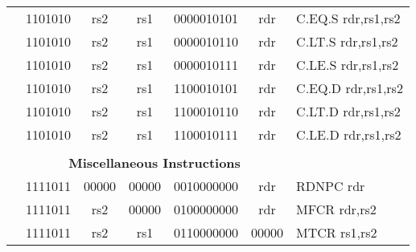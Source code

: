 \begin{table}[p]
\begin{small}
\begin{center}
\begin{tabular}{rcccccccccccl}
&
\multicolumn{2}{|c|}{1101010} &
\multicolumn{1}{c|}{rs2} &
\multicolumn{1}{c|}{rs1} &
\multicolumn{6}{c|}{0000010101} &
\multicolumn{1}{c|}{rdr} & C.EQ.S rdr,rs1,rs2 \\
\cline{2-12}
  

&
\multicolumn{2}{|c|}{1101010} &
\multicolumn{1}{c|}{rs2} &
\multicolumn{1}{c|}{rs1} &
\multicolumn{6}{c|}{0000010110} &
\multicolumn{1}{c|}{rdr} & C.LT.S rdr,rs1,rs2 \\
\cline{2-12}
  

&
\multicolumn{2}{|c|}{1101010} &
\multicolumn{1}{c|}{rs2} &
\multicolumn{1}{c|}{rs1} &
\multicolumn{6}{c|}{0000010111} &
\multicolumn{1}{c|}{rdr} & C.LE.S rdr,rs1,rs2 \\
\cline{2-12}
  

&
\multicolumn{2}{|c|}{1101010} &
\multicolumn{1}{c|}{rs2} &
\multicolumn{1}{c|}{rs1} &
\multicolumn{6}{c|}{1100010101} &
\multicolumn{1}{c|}{rdr} & C.EQ.D rdr,rs1,rs2 \\
\cline{2-12}
  

&
\multicolumn{2}{|c|}{1101010} &
\multicolumn{1}{c|}{rs2} &
\multicolumn{1}{c|}{rs1} &
\multicolumn{6}{c|}{1100010110} &
\multicolumn{1}{c|}{rdr} & C.LT.D rdr,rs1,rs2 \\
\cline{2-12}
  

&
\multicolumn{2}{|c|}{1101010} &
\multicolumn{1}{c|}{rs2} &
\multicolumn{1}{c|}{rs1} &
\multicolumn{6}{c|}{1100010111} &
\multicolumn{1}{c|}{rdr} & C.LE.D rdr,rs1,rs2 \\
\cline{2-12}
  

&
\multicolumn{11}{c}{} & \\
&
\multicolumn{11}{c}{\bf Miscellaneous Instructions} & \\
\cline{2-12}
  

&
\multicolumn{2}{|c|}{1111011} &
\multicolumn{1}{c|}{00000} &
\multicolumn{1}{c|}{00000} &
\multicolumn{6}{c|}{0010000000} &
\multicolumn{1}{c|}{rdr} & RDNPC rdr \\
\cline{2-12}
  

&
\multicolumn{2}{|c|}{1111011} &
\multicolumn{1}{c|}{rs2} &
\multicolumn{1}{c|}{00000} &
\multicolumn{6}{c|}{0100000000} &
\multicolumn{1}{c|}{rdr} & MFCR rdr,rs2 \\
\cline{2-12}
  

&
\multicolumn{2}{|c|}{1111011} &
\multicolumn{1}{c|}{rs2} &
\multicolumn{1}{c|}{rs1} &
\multicolumn{6}{c|}{0110000000} &
\multicolumn{1}{c|}{00000} & MTCR rs1,rs2 \\
\cline{2-12}
  


\end{tabular}
\end{center}
\end{small}
\end{table}
